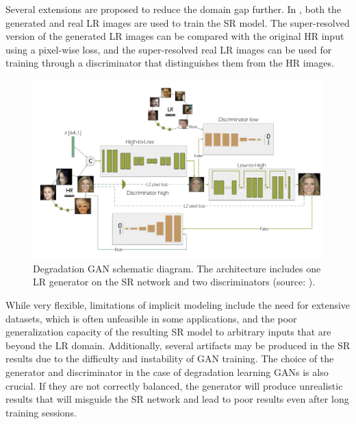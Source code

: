         Several extensions are proposed to reduce the domain gap further. 
        In \cite{wei2020unsupervised}, both the generated and real LR images are used to train the SR model.
        The super-resolved version of the generated LR images can be compared with the original HR input using a pixel-wise loss, and the super-resolved real LR images can be used for training through a discriminator that distinguishes them from the HR images.

        \begin{figure}[H]
            \centering
            \includegraphics[width=\textwidth]{Includes/2-degradation-gan.png}
            \caption{Degradation GAN schematic diagram. The architecture includes one LR generator on the SR network and two discriminators (source: \cite{bulat2018learn}).}    
            \label{fig:2-degradation-gan}
        \end{figure}
        
    
        While very flexible, limitations of implicit modeling include the need for extensive datasets, which is often unfeasible in some applications, and the poor generalization capacity of the resulting SR model to arbitrary inputs that are beyond the LR domain. 
        Additionally, several artifacts may be produced in the SR results due to the difficulty and instability of GAN training.
        The choice of the generator and discriminator in the case of degradation learning GANs is also crucial. If they are not correctly balanced, the generator will produce unrealistic results that will misguide the SR network and lead to poor results even after long training sessions.

         
\clearpage